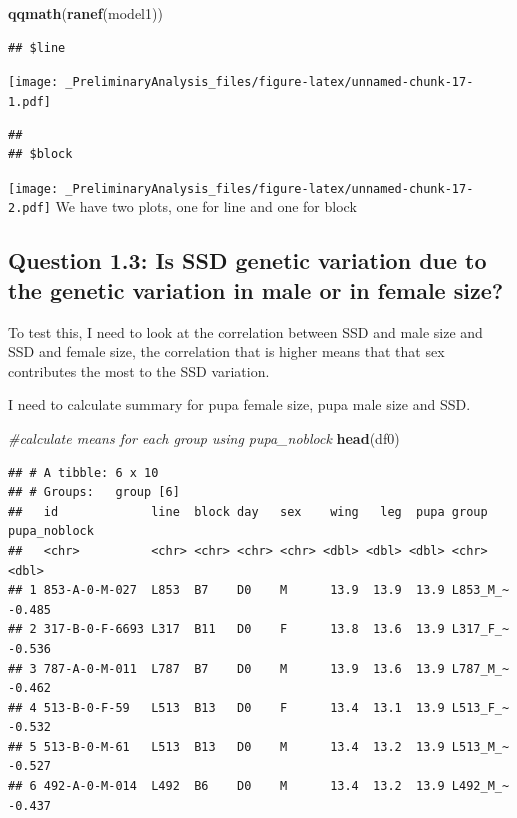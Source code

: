 \documentclass[
]{article}
\newenvironment{Shaded}{\begin{snugshade}}{\end{snugshade}}
\newcommand{\CommentTok}[1]{\textcolor[rgb]{0.56,0.35,0.01}{\textit{#1}}}
\newcommand{\KeywordTok}[1]{\textcolor[rgb]{0.13,0.29,0.53}{\textbf{#1}}}
\newcommand{\NormalTok}[1]{#1}
\begin{document}
\begin{Shaded}
\begin{Highlighting}[]
\KeywordTok{qqmath}\NormalTok{(}\KeywordTok{ranef}\NormalTok{(model1))}
\end{Highlighting}
\end{Shaded}

\begin{verbatim}
## $line
\end{verbatim}

\texttt{[image: \_PreliminaryAnalysis\_files/figure-latex/unnamed-chunk-17-1.pdf]}

\begin{verbatim}
## 
## $block
\end{verbatim}

\texttt{[image: \_PreliminaryAnalysis\_files/figure-latex/unnamed-chunk-17-2.pdf]}
We have two plots, one for line and one for block

\hypertarget{question-1.3-is-ssd-genetic-variation-due-to-the-genetic-variation-in-male-or-in-female-size}{%
\subsection{Question 1.3: Is SSD genetic variation due to the genetic
variation in male or in female
size?}\label{question-1.3-is-ssd-genetic-variation-due-to-the-genetic-variation-in-male-or-in-female-size}}

To test this, I need to look at the correlation between SSD and male
size and SSD and female size, the correlation that is higher means that
that sex contributes the most to the SSD variation.

I need to calculate summary for pupa female size, pupa male size and
SSD.

\begin{Shaded}
\begin{Highlighting}[]
\CommentTok{#calculate means for each group using pupa_noblock}
\KeywordTok{head}\NormalTok{(df0)}
\end{Highlighting}
\end{Shaded}

\begin{verbatim}
## # A tibble: 6 x 10
## # Groups:   group [6]
##   id             line  block day   sex    wing   leg  pupa group    pupa_noblock
##   <chr>          <chr> <chr> <chr> <chr> <dbl> <dbl> <dbl> <chr>           <dbl>
## 1 853-A-0-M-027  L853  B7    D0    M      13.9  13.9  13.9 L853_M_~       -0.485
## 2 317-B-0-F-6693 L317  B11   D0    F      13.8  13.6  13.9 L317_F_~       -0.536
## 3 787-A-0-M-011  L787  B7    D0    M      13.9  13.6  13.9 L787_M_~       -0.462
## 4 513-B-0-F-59   L513  B13   D0    F      13.4  13.1  13.9 L513_F_~       -0.532
## 5 513-B-0-M-61   L513  B13   D0    M      13.4  13.2  13.9 L513_M_~       -0.527
## 6 492-A-0-M-014  L492  B6    D0    M      13.4  13.2  13.9 L492_M_~       -0.437
\end{verbatim}
\end{document}
